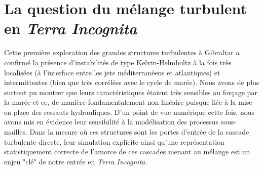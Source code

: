 


\section{La question du mélange turbulent en \textit{Terra Incognita}}
Cette première exploration des grandes structures turbulentes à Gibraltar a confirmé la présence d'instabilités de type Kelvin-Helmholtz à la fois très localisées (à l'interface entre les jets méditerranéens et atlantiques) et intermittentes (bien que très corrélées avec le cycle de marée). Nous avons de plus surtout pu montrer que leurs caractéristiques étaient très sensibles au forçage par la marée et ce, de manière fondamentalement non-linéaire puisque liée à la mise en place des ressauts hydrauliques. D'un point de vue numérique cette fois, nous avons mis en évidence leur sensibilité à la modélisation des processus sous-mailles.
Dans la mesure où ces structures sont les portes d'entrée de la cascade turbulente directe, leur simulation explicite ainsi qu'une représentation statistiquement correcte de l'amorce de ces cascades menant au mélange est un enjeu "clé" de notre entrée en \textit{Terra Incognita}.


